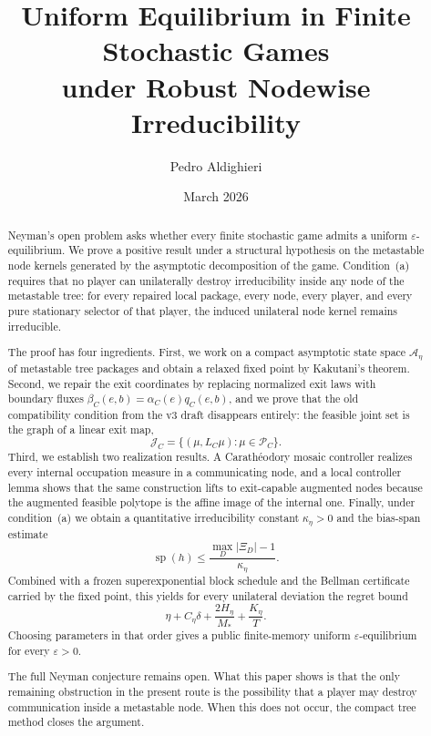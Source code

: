 \documentclass[12pt]{article}
\title{\textbf{Uniform Equilibrium in Finite Stochastic Games\\under Robust Nodewise Irreducibility}}
\author{Pedro Aldighieri}
\date{March 2026}
\theoremstyle{definition}
\newcommand{\eps}{\varepsilon}
\newcommand{\1}{\mathbf{1}}
\newcommand{\cA}{\mathcal{A}}
\newcommand{\cP}{\mathcal{P}}
\DeclareMathOperator{\spn}{sp}
\begin{document}
\maketitle

\begin{abstract}
Neyman's open problem asks whether every finite stochastic game admits a uniform
$\eps$-equilibrium.  We prove a positive result under a structural hypothesis on the
metastable node kernels generated by the asymptotic decomposition of the game.
Condition~(a) requires that no player can unilaterally destroy irreducibility inside any
node of the metastable tree: for every repaired local package, every node, every player,
and every pure stationary selector of that player, the induced unilateral node kernel
remains irreducible.

The proof has four ingredients.  First, we work on a compact asymptotic state space
$\cA_\eta$ of metastable tree packages and obtain a relaxed fixed point by
Kakutani's theorem.  Second, we repair the exit coordinates by replacing normalized
exit laws with boundary fluxes
$\beta_C(e,b)=\alpha_C(e)q_C(e,b)$, and we prove that the old compatibility condition
from the v3 draft disappears entirely: the feasible joint set is the graph of a linear
exit map,
\[
\mathcal J_C=\{(\mu,L_C\mu):\mu\in\cP_C\}.
\]
Third, we establish two realization results.  A Carath\'eodory mosaic controller
realizes every internal occupation measure in a communicating node, and a local controller
lemma shows that the same construction lifts to exit-capable augmented nodes because the
augmented feasible polytope is the affine image of the internal one.  Finally, under
condition~(a) we obtain a quantitative irreducibility constant $\kappa_\eta>0$ and the
bias-span estimate
\[
\spn(h)\le \frac{\max_D|\Xi_D|-1}{\kappa_\eta}.
\]
Combined with a frozen superexponential block schedule and the Bellman certificate carried
by the fixed point, this yields for every unilateral deviation the regret bound
\[
\eta + C_\eta\delta + \frac{2H_\eta}{M_*} + \frac{K_\eta}{T}.
\]
Choosing parameters in that order gives a public finite-memory uniform
$\eps$-equilibrium for every $\eps>0$.

The full Neyman conjecture remains open.  What this paper shows is that the only
remaining obstruction in the present route is the possibility that a player may
destroy communication inside a metastable node.  When this does not occur, the compact
tree method closes the argument.
\end{abstract}
\end{document}
